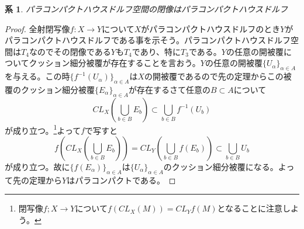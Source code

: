 \documentclass[leqno]{jsarticle}
\newtheorem{cor}[thm]{系}
\newcommand{\al}{\alpha}
\begin{document}
\begin{cor}
パラコンパクトハウスドルフ空間の閉像はパラコンパクトハウスドルフ
\end{cor}
\begin{proof}
全射閉写像$f:X\to Y$について$X$がパラコンパクトハウスドルフのとき$Y$がパラコンパクトハウスドルフである事を示そう。パラコンパクトハウスドルフ空間は$T_4$なのでその閉像である$Y$も$T_4$であり、特に$T_3$である。$Y$の任意の開被覆についてクッション細分被覆が存在することを言おう。$Y$の任意の開被覆$\{U_{\al}\}_{\al\in A}$を与える。この時$\{f^{-1}(U_{\al})\}_{\al\in A}$は$X$の開被覆であるので先の定理からこの被覆のクッション細分被覆$\{E_{\al}\}_{\al\in A}$が存在するさて任意の$B\subset A$について
\[
CL_X(\bigcup_{b\in B}E_{b})\subset \bigcup_{b\in B}f^{-1}(U_b)
\]
が成り立つ。\footnote{閉写像$f;X\to Y$について$f(CL_X(M))=CL_Yf(M)$となることに注意しよう。}よって$f$で写すと
\[
f\left(CL_X(\bigcup_{b\in B}E_{b})\right)=CL_Y\left(\bigcup_{b\in B}f(E_{b})\right)\subset \bigcup_{b\in B}U_b
\]
が成り立つ。故に$\{f(E_{\al})\}_{\al\in A}$は$\{U_{\al}\}_{\al\in A}$のクッション細分被覆になる。よって先の定理から$Y$はパラコンパクトである。
\end{proof}
\end{document}
